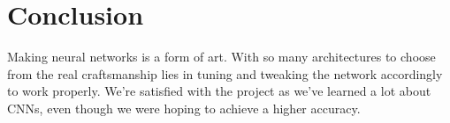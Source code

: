 \documentclass{kthreport}
\begin{document}
\section{Conclusion}
Making neural networks is a form of art. With so many architectures to choose from the real craftsmanship lies in tuning and tweaking the network accordingly to work properly. We're satisfied with the project as we've learned a lot about CNNs, even though we were hoping to achieve a higher accuracy.


{}

\end{document}
